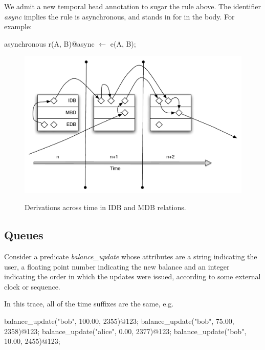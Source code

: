 We admit a new temporal head annotation to sugar the rule above.
The identifier \emph{async} implies the rule is asynchronous, and stands in for
 in the body.  
For example:


\begin{Dedalus}
asynchronous
r(A, B)@async \(\leftarrow\) 
  e(A, B);
\end{Dedalus}



\begin{figure}[t]
  \centering
  \includegraphics[width=1\linewidth]{edbidbmdb.pdf}
  \label{fig:edbidbmdb}
  \caption{Derivations across time in IDB and MDB relations.}
\vspace{-8pt}
\end{figure}



\subsection{Queues}

Consider a predicate \emph{balance\_update} whose attributes are a string indicating the user, a floating point number
indicating the new balance and an integer indicating the order in which the updates were issued, according to some 
external clock or sequence.  

In this trace, all of the time suffixes are the same, e.g.

\begin{Dedalus}
balance\_update("bob", 100.00, 2355)@123;
balance\_update("bob", 75.00, 2358)@123;
balance\_update("alice", 0.00, 2377)@123;
balance\_update("bob", 10.00, 2455)@123;
\end{Dedalus}

